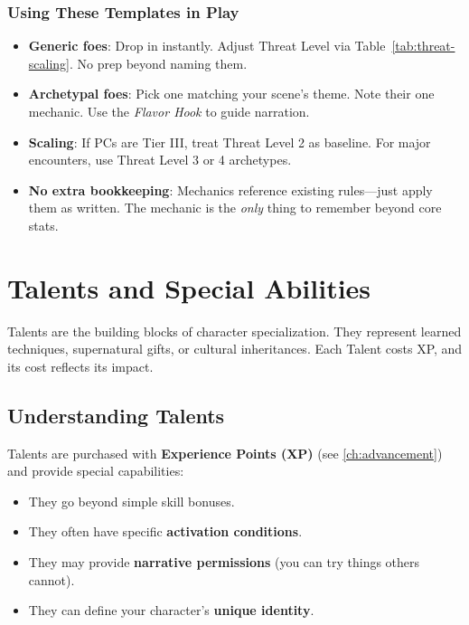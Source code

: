 \subsection{Using These Templates in Play}
\begin{itemize}
    \item \textbf{Generic foes}: Drop in instantly. Adjust Threat Level via Table~\ref{tab:threat-scaling}. No prep beyond naming them.
    \item \textbf{Archetypal foes}: Pick one matching your scene's theme. Note their one mechanic. Use the \textit{Flavor Hook} to guide narration.
    \item \textbf{Scaling}: If PCs are Tier III, treat Threat Level 2 as baseline. For major encounters, use Threat Level 3 or 4 archetypes.
    \item \textbf{No extra bookkeeping}: Mechanics reference existing rules---just apply them as written. The mechanic is the \textit{only} thing to remember beyond core stats.
\end{itemize}

\chapter{Talents and Special Abilities}
\label{ch:talents}

Talents are the building blocks of character specialization. They represent learned techniques, supernatural gifts, or cultural inheritances. Each Talent costs XP, and its cost reflects its impact.

\section{Understanding Talents}
\label{sec:talents-understanding}

Talents are purchased with \textbf{Experience Points (XP)} (see \ref{ch:advancement}) and provide special capabilities:
\begin{itemize}
\item They go beyond simple skill bonuses.
\item They often have specific \textbf{activation conditions}.
\item They may provide \textbf{narrative permissions} (you can try things others cannot).
\item They can define your character's \textbf{unique identity}.
\end{itemize}

